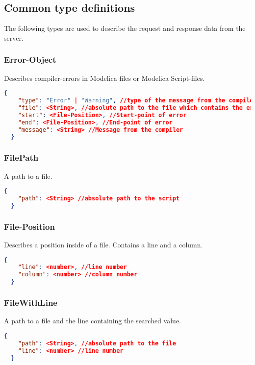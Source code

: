 \subsection{Common type definitions}
The following types are used to describe the request and response data
from the server.

  \subsubsection{Error-Object}
  Describes compiler-errors in Modelica files or Modelica Script-files.
  \newline{}
  \begin{lstlisting}[basicstyle=\small,language=json]
  {
    "type": "Error" | "Warning", //type of the message from the compiler
    "file": <String>, //absolute path to the file which contains the error
    "start": <File-Position>, //Start-point of error
    "end": <File-Position>, //End-point of error
    "message": <String> //Message from the compiler
  }
  \end{lstlisting}

  \subsubsection{FilePath}
  A path to a file.
  \newline{}
  \begin{lstlisting}[basicstyle=\small,language=json]
  {
    "path": <String> //absolute path to the script
  }
  \end{lstlisting}

  \subsubsection{File-Position}
  Describes a position inside of a file. Contains a
  line and a column.
  \newline{}
  \begin{lstlisting}[basicstyle=\small,language=json]
  {
    "line": <number>, //line number
    "column": <number> //column number
  }
  \end{lstlisting}

  \subsubsection{FileWithLine}
  A path to a file and the line containing the searched value.
  \newline{}
  \begin{lstlisting}[basicstyle=\small,language=json]
  {
    "path": <String>, //absolute path to the file
    "line": <number> //line number
  }
  \end{lstlisting}

